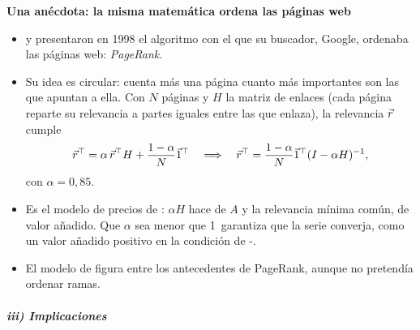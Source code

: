 \documentclass[11pt]{article}
\begin{document}
\begin{anotaciones}
\textbf{Una anécdota: la misma matemática ordena las páginas web}
\begin{itemize}
\item {} y  presentaron en 1998 el algoritmo con el que su buscador, Google, ordenaba las páginas web: \emph{PageRank}\nocite{BrinPage1998}.
\item Su idea es circular: cuenta más una página cuanto más importantes son las que apuntan a ella. Con $N$ páginas y $H$ la matriz de enlaces (cada página reparte su relevancia a partes iguales entre las que enlaza), la relevancia $\vec{r}$ cumple
\[
\vec{r}^{\top}=\alpha\,\vec{r}^{\top}H+\frac{1-\alpha}{N}\vec{1}^{\top}\quad\Longrightarrow\quad\vec{r}^{\top}=\frac{1-\alpha}{N}\vec{1}^{\top}(I-\alpha H)^{-1},
\]
  con $\alpha=0{,}85$.
\item Es el modelo de precios de : $\alpha H$ hace de $A$ y la relevancia mínima común, de valor añadido. Que $\alpha$ sea menor que 1~garantiza que la serie converja, como un valor añadido positivo en la condición de -.
\item El modelo de  figura entre los antecedentes de PageRank, aunque  no pretendía ordenar ramas\nocite{Franceschet2011}.
\end{itemize}
\end{anotaciones}

\subparagraph{iii) Implicaciones}
\end{document}
